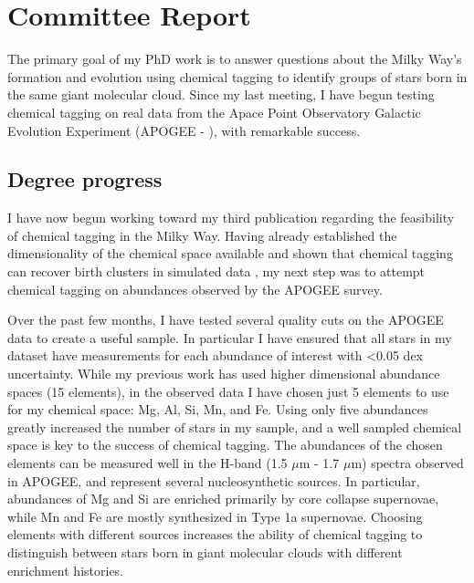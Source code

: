 \documentclass[11pt]{article}
\begin{document}
    
    \section*{Committee Report}
    
    The primary goal of my PhD work is to answer questions about the Milky Way's formation and evolution using chemical tagging to identify groups of stars born in the same giant molecular cloud. Since my last meeting, I have begun testing chemical tagging on real data from the Apace Point Observatory Galactic Evolution Experiment (APOGEE - \citealt{Majewski2017}), with remarkable success. 

    \subsection*{Degree progress}

	I have now begun working toward my third publication regarding the feasibility of chemical tagging in the Milky Way. Having already established the dimensionality of the chemical space available \citep{Price-Jones2018} and shown that chemical tagging can recover birth clusters in simulated data \citep{Price-Jones2019}, my next step was to attempt chemical tagging on abundances observed by the APOGEE survey.
	
	Over the past few months, I have tested several quality cuts on the APOGEE data to create a useful sample. In particular I have ensured that all stars in my dataset have measurements for each abundance of interest with <0.05 dex uncertainty. While my previous work has used higher dimensional abundance spaces (15 elements), in the observed data I have chosen just 5 elements to use for my chemical space: Mg, Al, Si, Mn, and Fe. Using only five abundances greatly increased the number of stars in my sample, and a well sampled chemical space is key to the success of chemical tagging. The abundances of the chosen elements can be measured well in the H-band (1.5 $\mu$m - 1.7 $\mu$m) spectra observed in APOGEE, and represent several nucleosynthetic sources. In particular, abundances of Mg and Si are enriched primarily by core collapse supernovae, while Mn and Fe are mostly synthesized in Type 1a supernovae. Choosing elements with different sources increases the ability of chemical tagging to distinguish between stars born in giant molecular clouds with different enrichment histories.
	
\end{document}
